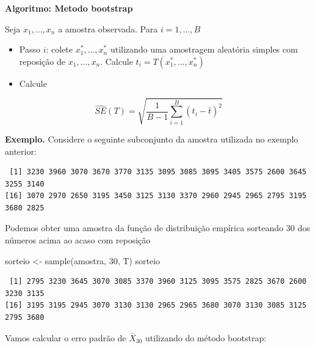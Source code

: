\documentclass[
  letterpaper,
  DIV=11,
  numbers=noendperiod]{scrartcl}
\newenvironment{Shaded}{\begin{snugshade}}{\end{snugshade}}
\newcommand{\DecValTok}[1]{\textcolor[rgb]{0.68,0.00,0.00}{#1}}
\newcommand{\FunctionTok}[1]{\textcolor[rgb]{0.28,0.35,0.67}{#1}}
\newcommand{\NormalTok}[1]{\textcolor[rgb]{0.00,0.23,0.31}{#1}}
\newcommand{\OtherTok}[1]{\textcolor[rgb]{0.00,0.23,0.31}{#1}}
\newcommand{\SpecialCharTok}[1]{\textcolor[rgb]{0.37,0.37,0.37}{#1}}
\begin{document}
\textbf{Algoritmo: Metodo bootstrap}

Seja \(x_1,\ldots,x_n\) a amostra observada. Para \(i=1,\ldots,B\)

\begin{itemize}
\item
  Passo \(i\): colete \(x_1^*,\ldots,x_n^*\) utilizando uma amostragem
  aleatória simples com reposição de \(x_1,\ldots,x_n\). Calcule
  \(t_i=T(x_1^*,\ldots,x_n^*)\)
\item
  Calcule
\end{itemize}

\[\widehat{SE}(T)=\sqrt{\frac{1}{B-1}\sum_{i=1}^B(t_i-\bar{t})^2}\]

\textbf{Exemplo.} Considere o seguinte subconjunto da amostra utilizada
no exemplo anterior:

\begin{Shaded}
\end{Shaded}

\begin{verbatim}
 [1] 3230 3960 3070 3670 3770 3135 3095 3085 3095 3405 3575 2600 3645 3255 3140
[16] 3070 2970 2650 3195 3450 3125 3130 3370 2960 2945 2965 2795 3195 3680 2825
\end{verbatim}

Podemos obter uma amostra da função de distribuição empírica sorteando
30 dos números acima ao acaso com reposição

\begin{Shaded}
\begin{Highlighting}[]
\NormalTok{sorteio }\OtherTok{\textless{}{-}} \FunctionTok{sample}\NormalTok{(amostra, }\DecValTok{30}\NormalTok{, T)}
\NormalTok{sorteio}
\end{Highlighting}
\end{Shaded}

\begin{verbatim}
 [1] 2795 3230 3645 3070 3085 3370 3960 3125 3095 3575 2825 3670 2600 3230 3135
[16] 3195 3195 2945 3070 3130 3130 2965 2965 3680 3070 3130 3085 3125 2795 3680
\end{verbatim}

Vamos calcular o erro padrão de \(\bar{X}_{30}\) utilizando do método
bootstrap:
\end{document}
